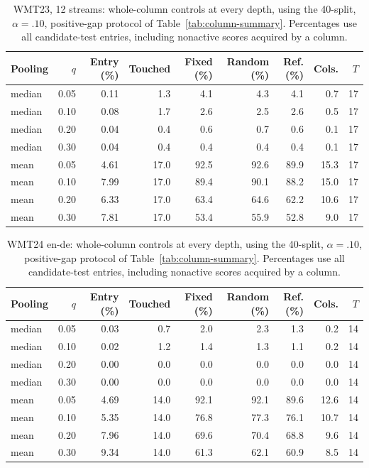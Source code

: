 \begin{table}[t]
\centering\small
\begin{tabular}{lrrrrrrrr}
\toprule
Pooling & $q$ & Entry (\%) & Touched & Fixed (\%) & Random (\%) & Ref. (\%) & Cols. & $T$ \\
\midrule
median & 0.05 & 0.11 & 1.3 & 4.1 & 4.3 & 4.1 & 0.7 & 17 \\
median & 0.10 & 0.08 & 1.7 & 2.6 & 2.5 & 2.6 & 0.5 & 17 \\
median & 0.20 & 0.04 & 0.4 & 0.6 & 0.7 & 0.6 & 0.1 & 17 \\
median & 0.30 & 0.04 & 0.4 & 0.4 & 0.4 & 0.4 & 0.1 & 17 \\
mean & 0.05 & 4.61 & 17.0 & 92.5 & 92.6 & 89.9 & 15.3 & 17 \\
mean & 0.10 & 7.99 & 17.0 & 89.4 & 90.1 & 88.2 & 15.0 & 17 \\
mean & 0.20 & 6.33 & 17.0 & 63.4 & 64.6 & 62.2 & 10.6 & 17 \\
mean & 0.30 & 7.81 & 17.0 & 53.4 & 55.9 & 52.8 & 9.0 & 17 \\
\bottomrule
\end{tabular}
\caption{WMT23, 12 streams: whole-column controls at every depth, using the 40-split, $\alpha=.10$, positive-gap protocol of Table~\ref{tab:column-summary}. Percentages use all candidate-test entries, including nonactive scores acquired by a column.}
\label{tab:column-all-2}
\end{table}

\begin{table}[t]
\centering\small
\begin{tabular}{lrrrrrrrr}
\toprule
Pooling & $q$ & Entry (\%) & Touched & Fixed (\%) & Random (\%) & Ref. (\%) & Cols. & $T$ \\
\midrule
median & 0.05 & 0.03 & 0.7 & 2.0 & 2.3 & 1.3 & 0.2 & 14 \\
median & 0.10 & 0.02 & 1.2 & 1.4 & 1.3 & 1.1 & 0.2 & 14 \\
median & 0.20 & 0.00 & 0.0 & 0.0 & 0.0 & 0.0 & 0.0 & 14 \\
median & 0.30 & 0.00 & 0.0 & 0.0 & 0.0 & 0.0 & 0.0 & 14 \\
mean & 0.05 & 4.69 & 14.0 & 92.1 & 92.1 & 89.6 & 12.6 & 14 \\
mean & 0.10 & 5.35 & 14.0 & 76.8 & 77.3 & 76.1 & 10.7 & 14 \\
mean & 0.20 & 7.96 & 14.0 & 69.6 & 70.4 & 68.8 & 9.6 & 14 \\
mean & 0.30 & 9.34 & 14.0 & 61.3 & 62.1 & 60.9 & 8.5 & 14 \\
\bottomrule
\end{tabular}
\caption{WMT24 en-de: whole-column controls at every depth, using the 40-split, $\alpha=.10$, positive-gap protocol of Table~\ref{tab:column-summary}. Percentages use all candidate-test entries, including nonactive scores acquired by a column.}
\label{tab:column-all-3}
\end{table}

